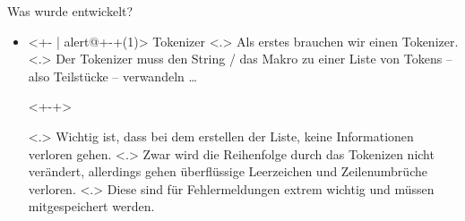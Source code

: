   \begin{frame}{Was wurde entwickelt?}
    \begin{itemize}[<+- | alert@+>]
      \item<+- | alert@+-+(1)>
        Tokenizer
            \note[item]<.>{
              Als erstes brauchen wir einen Tokenizer.
            }
            \note[item]<.>{
              Der Tokenizer muss den String / das Makro zu einer Liste von Tokens -- also Teilstücke -- verwandeln \ldots
            }
        \begin{uncoverenv}<+-+>%
        \end{uncoverenv}%
            \note[item]<.>{
              Wichtig ist, dass bei dem erstellen der Liste, keine Informationen verloren gehen.
            }
            \note[item]<.>{
              Zwar wird die Reihenfolge durch das Tokenizen nicht verändert, allerdings gehen überflüssige Leerzeichen und Zeilenumbrüche verloren.
            }
            \note[item]<.>{
              Diese sind für Fehlermeldungen extrem wichtig und müssen mitgespeichert werden.
            }


\end{itemize}
\end{frame}
